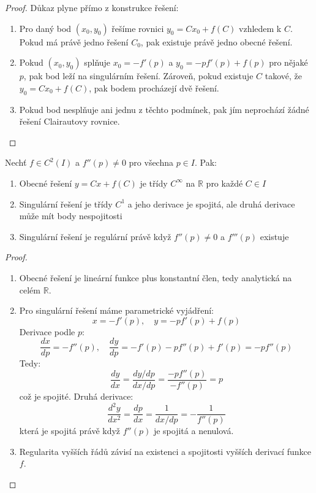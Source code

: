 \begin{proof}
Důkaz plyne přímo z konstrukce řešení:
\begin{enumerate}
\item Pro daný bod $(x_0, y_0)$ řešíme rovnici $y_0 = Cx_0 + f(C)$ vzhledem k $C$. Pokud má právě jedno řešení $C_0$, pak existuje právě jedno obecné řešení.
\item Pokud $(x_0, y_0)$ splňuje $x_0 = -f'(p)$ a $y_0 = -pf'(p) + f(p)$ pro nějaké $p$, pak bod leží na singulárním řešení. Zároveň, pokud existuje $C$ takové, že $y_0 = Cx_0 + f(C)$, pak bodem procházejí dvě řešení.
\item Pokud bod nesplňuje ani jednu z těchto podmínek, pak jím neprochází žádné řešení Clairautovy rovnice.
\end{enumerate}
\end{proof}

\begin{theorem}
Nechť $f \in C^2(I)$ a $f''(p) \neq 0$ pro všechna $p \in I$. Pak:
\begin{enumerate}
\item Obecné řešení $y = Cx + f(C)$ je třídy $C^\infty$ na $\mathbb{R}$ pro každé $C \in I$
\item Singulární řešení je třídy $C^1$ a jeho derivace je spojitá, ale druhá derivace může mít body nespojitosti
\item Singulární řešení je regulární právě když $f''(p) \neq 0$ a $f'''(p)$ existuje
\end{enumerate}
\end{theorem}

\begin{proof}
\begin{enumerate}
\item Obecné řešení je lineární funkce plus konstantní člen, tedy analytická na celém $\mathbb{R}$.
\item Pro singulární řešení máme parametrické vyjádření:
\[
x = -f'(p), \quad y = -pf'(p) + f(p)
\]
Derivace podle $p$:
\[
\frac{dx}{dp} = -f''(p), \quad \frac{dy}{dp} = -f'(p) - pf''(p) + f'(p) = -pf''(p)
\]
Tedy:
\[
\frac{dy}{dx} = \frac{dy/dp}{dx/dp} = \frac{-pf''(p)}{-f''(p)} = p
\]
což je spojité. Druhá derivace:
\[
\frac{d^2y}{dx^2} = \frac{dp}{dx} = \frac{1}{dx/dp} = -\frac{1}{f''(p)}
\]
která je spojitá právě když $f''(p)$ je spojitá a nenulová.
\item Regularita vyšších řádů závisí na existenci a spojitosti vyšších derivací funkce $f$.
\end{enumerate}
\end{proof}


